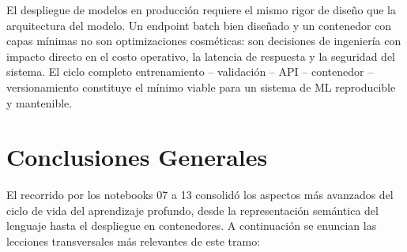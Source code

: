 \documentclass[12pt, a4paper]{article}
\begin{document}
El despliegue de modelos en producción requiere el mismo rigor de diseño que la arquitectura del modelo. Un endpoint batch bien diseñado y un contenedor con capas mínimas no son optimizaciones cosméticas: son decisiones de ingeniería con impacto directo en el costo operativo, la latencia de respuesta y la seguridad del sistema. El ciclo completo entrenamiento -- validación -- API -- contenedor -- versionamiento constituye el mínimo viable para un sistema de ML reproducible y mantenible.

\section{Conclusiones Generales}

El recorrido por los notebooks 07 a 13 consolidó los aspectos más avanzados del ciclo de vida del aprendizaje profundo, desde la representación semántica del lenguaje hasta el despliegue en contenedores. A continuación se enuncian las lecciones transversales más relevantes de este tramo:
\end{document}
